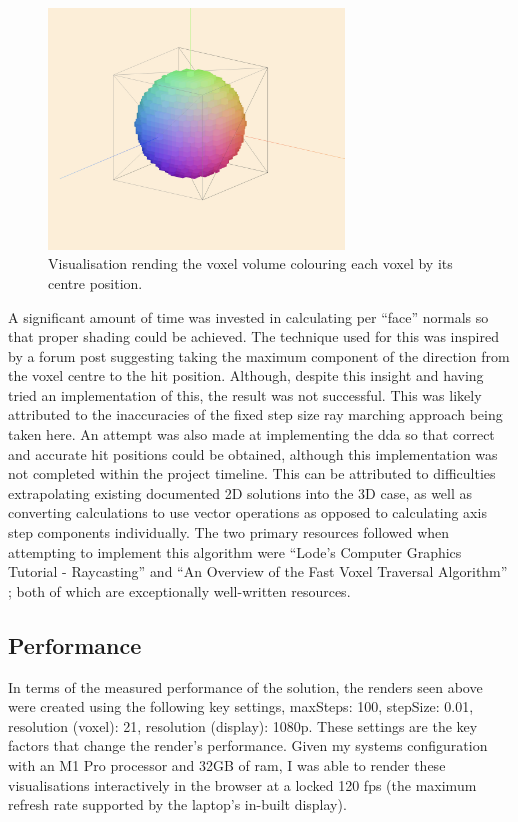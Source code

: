 \documentclass[titlepage]{article}
\begin{document}
\begin{figure}[htp]
  \centering
  \includegraphics[width=0.7\textwidth]{position.png}
  \caption{Visualisation rending the voxel volume colouring each voxel by its centre position.}
\end{figure}
\FloatBarrier

A significant amount of time was invested in calculating per ``face'' normals so that proper shading could be achieved. The technique used for this was inspired by a forum post \cite{reddit} suggesting taking the maximum component of the direction from the voxel centre to the hit position. Although, despite this insight and having tried an implementation of this, the result was not successful. This was likely attributed to the inaccuracies of the fixed step size ray marching approach being taken here. An attempt was also made at implementing the \gls{dda} so that correct and accurate hit positions could be obtained, although this implementation was not completed within the project timeline. This can be attributed to difficulties extrapolating existing documented 2D solutions into the 3D case, as well as converting calculations to use vector operations as opposed to calculating axis step components individually. The two primary resources followed when attempting to implement this algorithm were ``Lode's Computer Graphics Tutorial - Raycasting'' \cite{dda:article} and ``An Overview of the Fast Voxel Traversal Algorithm'' \cite{dda:github}; both of which are exceptionally well-written resources.

\subsection{Performance}

In terms of the measured performance of the solution, the renders seen above were created using the following key settings, maxSteps: 100, stepSize: 0.01, resolution (voxel): 21, resolution (display): 1080p. These settings are the key factors that change the render's performance. Given my systems configuration with an M1 Pro processor and 32GB of \gls{ram}, I was able to render these visualisations interactively in the browser at a locked 120 \gls{fps} (the maximum refresh rate supported by the laptop's in-built display).
\end{document}
